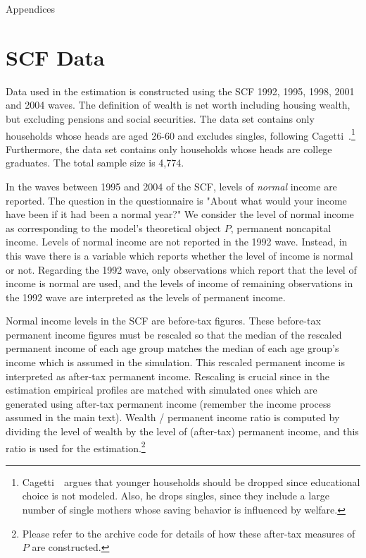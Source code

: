 \documentclass[titlepage, headings=optiontotocandhead]{econtex}
\begin{document}
\clearpage\vfill\eject

\centerline{\LARGE Appendices}\vspace{0.2in}

\appendix


\hypertarget{scf-data}{}
\section{SCF Data}\label{app:scf-data}

Data used in the estimation is constructed using the SCF 1992, 1995, 1998, 2001 and 2004 waves. The definition of wealth is net worth including housing wealth, but excluding pensions and social securities. The data set contains only households whose heads are aged 26-60 and excludes singles, following Cagetti~\citeyearpar{cagettiWprofiles}.\footnote{Cagetti~\citeyearpar{cagettiWprofiles}\ argues that younger households should be dropped since educational choice is not modeled. Also, he drops singles, since they include a large number of single mothers whose saving behavior is influenced by welfare.} Furthermore, the data set contains only households whose heads are college graduates. The total sample size is 4,774.

In the waves between 1995 and 2004 of the SCF, levels of \textit{normal} income are reported. The question in the questionnaire is "About what would your income have been if it had been a normal year?" We consider the level of normal income as corresponding to the model's theoretical object $P$, permanent noncapital income. Levels of normal income are not reported in the 1992 wave. Instead, in this wave there is a variable which reports whether the level of income is normal or not. Regarding the 1992 wave, only observations which report that the level of income is normal are used, and the levels of income of remaining observations in the 1992 wave are interpreted as the levels of permanent income.

Normal income levels in the SCF are before-tax figures. These before-tax permanent income figures must be rescaled so that the median of the rescaled permanent income of each age group matches the median of each age group's income which is assumed in the simulation. This rescaled permanent income is interpreted as after-tax permanent income. Rescaling is crucial since in the estimation empirical profiles are matched with simulated ones which are generated using after-tax permanent income (remember the income process assumed in the main text). Wealth / permanent income ratio is computed by dividing the level of wealth by the level of (after-tax) permanent income, and this ratio is used for the estimation.\footnote{Please refer to the archive code for details of how these after-tax measures of $P$ are constructed.}
\end{document}
